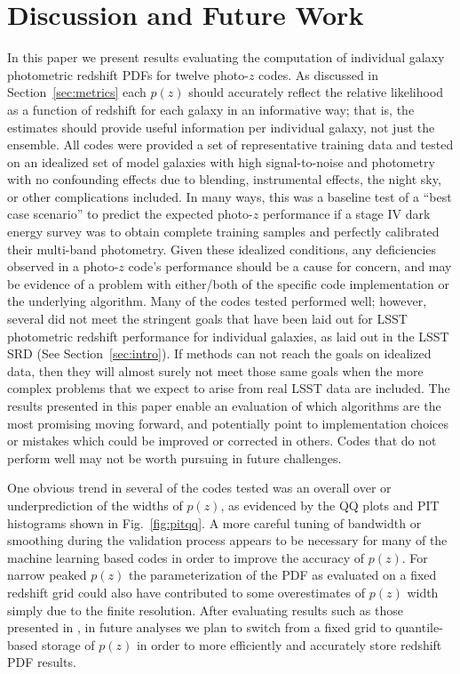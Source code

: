 \section{Discussion and Future Work}
\label{sec:discussion}
In this paper we present results evaluating the computation of individual galaxy photometric redshift PDFs for twelve photo-$z$ codes.
As discussed in Section~\ref{sec:metrics} each $p(z)$ should accurately reflect the relative likelihood as a function of redshift for each galaxy in an informative way; that is, the estimates should provide useful information per individual galaxy, not just the ensemble.
All codes were provided a set of representative training data and tested on an idealized set of model galaxies with high signal-to-noise and photometry with no confounding effects due to blending, instrumental effects, the night sky, or other complications included.  %
In many ways, this was a baseline test of a ``best case scenario'' to predict the expected photo-$z$ performance if a stage IV dark energy survey was to obtain complete training samples and perfectly calibrated their multi-band photometry.
Given these idealized conditions, any deficiencies observed in a photo-$z$ code's performance should be a cause for concern, and may be evidence of a problem with either/both of the specific code implementation or the underlying algorithm.
Many of the codes tested performed well; however, several did not meet the stringent goals that have been laid out for LSST photometric redshift performance for individual galaxies, as laid out in the LSST SRD (See Section~\ref{sec:intro}).%
If methods can not reach the goals on idealized data, then they will almost surely not meet those same goals when the more complex problems that we expect to arise from real LSST data are included.
The results presented in this paper enable an evaluation of which algorithms are the most promising moving forward, and potentially point to implementation choices or mistakes which could be improved or corrected in others.
Codes that do not perform well may not be worth pursuing in future challenges.

One obvious trend in several of the codes tested was an overall over or underprediction of the widths of $p(z)$, as evidenced by the QQ plots and PIT histograms shown in Fig.~\ref{fig:pitqq}.
A more careful tuning of bandwidth or smoothing during the validation process appears to be necessary for many of the machine learning based codes in order to improve the accuracy of $p(z)$.
For narrow peaked $p(z)$ the parameterization of the PDF as evaluated on a fixed redshift grid could also have contributed to some overestimates of $p(z)$ width simply due to the finite resolution.
After evaluating results such as those presented in \citet[]{Malz:qp}, in future analyses we plan to switch from a fixed grid to quantile-based storage of $p(z)$ in order to more efficiently and accurately store redshift PDF results.

